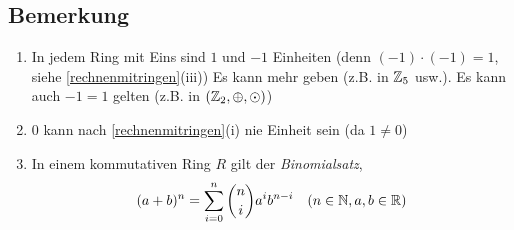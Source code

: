 \subsection{Bemerkung}

\begin{enumerate}
	\item
	In jedem Ring mit Eins sind $1$ und $-1$ Einheiten (denn $(-1) \cdot (-1) = 1$, siehe \ref{rechnenmitringen}(iii))
	Es kann mehr geben (z.B. in $\mathbb{Z}_5$ usw.).
	Es kann auch $-1 = 1$ gelten (z.B. in $(\mathbb{Z}_2, \oplus, \odot)$)
	
	\item
	$0$ kann nach  \ref{rechnenmitringen}(i) nie Einheit sein (da $1 \neq 0$)
	
	\item
	In einem kommutativen Ring $R$ gilt der \emph{Binomialsatz},
	\[(a+b)^n = \sum_{i=0}^{n}\binom{n}{i}a^ib^{n-i} \quad (n \in \mathbb{N}, a, b \in \mathbb{R})\]
	
	
\end{enumerate}






